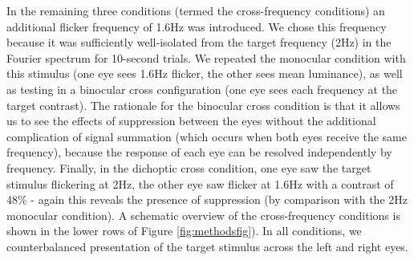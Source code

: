 \documentclass[
]{article}
\begin{document}
In the remaining three conditions (termed the cross-frequency conditions) an additional flicker frequency of 1.6Hz was introduced. We chose this frequency because it was sufficiently well-isolated from the target frequency (2Hz) in the Fourier spectrum for 10-second trials. We repeated the monocular condition with this stimulus (one eye sees 1.6Hz flicker, the other sees mean luminance), as well as testing in a binocular cross configuration (one eye sees each frequency at the target contrast). The rationale for the binocular cross condition is that it allows us to see the effects of suppression between the eyes without the additional complication of signal summation (which occurs when both eyes receive the same frequency), because the response of each eye can be resolved independently by frequency. Finally, in the dichoptic cross condition, one eye saw the target stimulus flickering at 2Hz, the other eye saw flicker at 1.6Hz with a contrast of 48\% - again this reveals the presence of suppression (by comparison with the 2Hz monocular condition). A schematic overview of the cross-frequency conditions is shown in the lower rows of Figure \ref{fig:methodsfig}). In all conditions, we counterbalanced presentation of the target stimulus across the left and right eyes.
\end{document}
